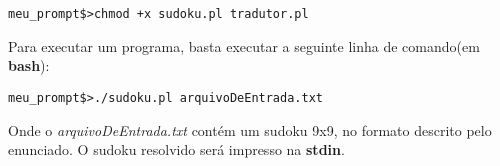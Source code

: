 \documentclass[11pt]{article}
\begin{document}
\begin{verbatim}
meu_prompt$>chmod +x sudoku.pl tradutor.pl
\end{verbatim}

Para executar um programa, basta executar a seguinte linha de comando(em \textbf{\color{red}bash}):

\begin{verbatim}
meu_prompt$>./sudoku.pl arquivoDeEntrada.txt
\end{verbatim}

Onde o \emph{arquivoDeEntrada.txt} contém um sudoku 9x9, no formato descrito pelo enunciado. O sudoku resolvido será impresso na \textbf{\color{red}stdin}.
\end{document}
